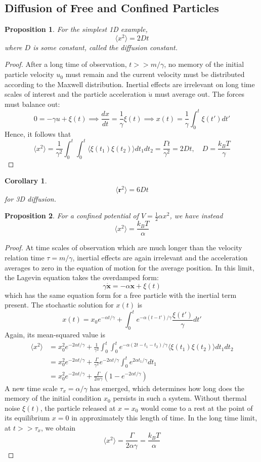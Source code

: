 \documentclass[a4paper]{article}
\theoremstyle{new}
\newtheorem{prop}{Proposition}[section]
\newtheorem{cor}{Corollary}[section]
\begin{document}
\subsection{Diffusion of Free and Confined Particles}
\begin{prop}
For the simplest 1D example,
$$\langle x^2\rangle=2Dt$$
where $D$ is some constant, called the diffusion constant.
\end{prop}
\begin{proof}
After a long time of observation, $t>>m/\gamma$, no memory of the initial particle velocity $u_0$ must remain and the current velocity must be distributed according to the Maxwell distribution. Inertial effects are irrelevant on long time scales of interest and the particle acceleration $\dot{u}$ must average out. The forces must balance out:
$$0=-\gamma u+\xi(t)\implies\frac{dx}{dt}=\frac{1}{\gamma}\xi(t)\implies x(t)=\frac{1}{\gamma}\int_0^t\xi(t')dt'$$
Hence, it follows that
$$\langle x^2\rangle=\frac{1}{\gamma^2}\int_0^t\int_0^t\langle\xi(t_1)\xi(t_2)\rangle dt_1dt_2=\frac{\Gamma t}{\gamma^2}=2Dt,\quad D=\frac{k_BT}{\gamma}$$
\end{proof}
\begin{cor}
$$\langle\mathbf{r}^2\rangle=6Dt$$
for 3D diffusion.
\end{cor}
\begin{prop}
For a confined potential of $V=\frac{1}{2}\alpha x^2$, we have instead
$$\langle x^2\rangle=\frac{k_BT}{\alpha}$$
\end{prop}
\begin{proof}
At time scales of observation which are much longer than the velocity relation time $\tau=m/\gamma$, inertial effects are again irrelevant and the acceleration averages to zero in the equation of motion for the average position. In this limit, the Lagevin equation takes the overdamped form:
$$\gamma\mathbf{\dot{x}}=-\alpha\mathbf{x}+\xi(t)$$
which has the same equation form for a free particle with the inertial term present. The stochastic solution for $x(t)$ is
$$x(t)=x_0e^{-\alpha t/\gamma}+\int_0^te^{-\alpha(t-t')/\gamma}\frac{\xi(t')}{\gamma}dt'$$
Again, its mean-squared value is
\begin{align}
    \langle x^2\rangle&=x_0^2e^{-2\alpha t/\gamma}+\frac{1}{\gamma^2}\int_0^t\int_0^te^{-\alpha(2t-t_1-t_2)/\gamma}\langle\xi(t_1)\xi(t_2)\rangle dt_1dt_2\nonumber\\&=x_0^2e^{-2\alpha t/\gamma}+\frac{\Gamma}{\gamma^2}e^{-2\alpha t/\gamma}\int_0^te^{2\alpha t_1/\gamma}dt_1\nonumber\\&=x_0^2e^{-2\alpha t/\gamma}+\frac{\Gamma}{2\alpha\gamma}(1-e^{-2\alpha t/\gamma})\nonumber
\end{align}
A new time scale $\tau_x=\alpha/\gamma$ has emerged, which determines how long does the memory of the initial condition $x_0$ persists in such a system. Without thermal noise $\xi(t)$, the particle released at $x=x_0$ would come to a rest at the point of its equilibrium $x=0$ in approximately this length of time. In the long time limit, at $t>>\tau_x$, we obtain
$$\langle x^2\rangle=\frac{\Gamma}{2\alpha\gamma}=\frac{k_BT}{\alpha}$$
\end{proof}
\end{document}
